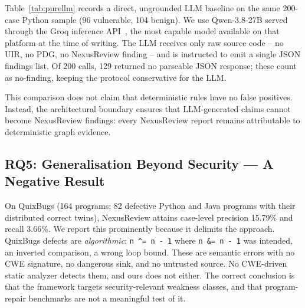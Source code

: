 \documentclass[10pt,conference]{IEEEtran}
\begin{document}
Table~\ref{tab:purellm} records a direct, ungrounded LLM baseline on the
same 200-case Python sample (96 vulnerable, 104 benign). We use
Qwen-3.8-27B served through the Groq inference API~\cite{qwen2025}, the
most capable model available on that platform at the time of writing.
The LLM receives only raw source code -- no UIR, no PDG, no NexusReview
finding -- and is instructed to emit a single JSON findings list.
Of 200 calls, 129 returned no parseable JSON response;
these count as no-finding, keeping the protocol conservative for the LLM.

\begin{table}[t]
\centering
\caption{RQ4: direct pure-LLM comparison on a 200-case Python sample,
case level. The LLM receives raw source only; 129 of 200 calls
returned no parseable JSON and are treated as no-finding.}
\label{tab:purellm}
\end{table}

This comparison does not claim that deterministic rules have no false
positives. Instead, the architectural boundary ensures that LLM-generated
claims cannot become NexusReview findings: every NexusReview report remains
attributable to deterministic graph evidence.

\subsection{RQ5: Generalisation Beyond Security --- A Negative Result}
On QuixBugs (164 programs; 82 defective Python and Java programs with their
distributed correct twins), NexusReview attains case-level precision 15.79\%
and recall 3.66\%. We report this prominently because it delimits the
approach. QuixBugs defects are \emph{algorithmic}: \texttt{n \^{}= n - 1} where
\texttt{n \&= n - 1} was intended, an inverted comparison, a wrong loop bound.
These are semantic errors with no CWE signature, no dangerous sink, and no
untrusted source. No CWE-driven static analyzer detects them, and ours does
not either. The correct conclusion is that the framework targets
security-relevant weakness classes, and that program-repair benchmarks are
not a meaningful test of it.
\end{document}
